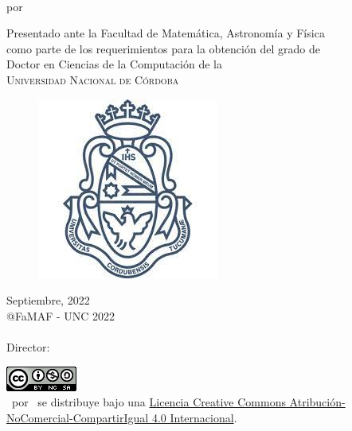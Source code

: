 \begin{titlepage}

\begin{center}
{\LARGE \ThesisTitle}\\ 
\vspace{10mm}
{\Large por \Author}\\

\vspace{35mm}

Presentado ante la Facultad de Matem\'atica, Astronom\'ia y F\'isica\\
como parte de los requerimientos para la obtenci\'on del grado de\\
Doctor en Ciencias de la Computaci\'on de la\\
\textsc{Universidad Nacional de C\'ordoba}\\
 
\vspace{20mm}

\begin{figure}[h] 
\begin{center}
    \includegraphics[scale=0.45]{Figs/cordoba.jpg} 
\end{center}
\end{figure}

Septiembre, 2022\\
@FaMAF - UNC 2022\\
\ \\
{\Large Director: \Supervisor}

\vspace{10mm}
\href{https://licensebuttons.net/l/by-nc-sa/4.0/88x31.png}{\includegraphics{Figs/licencia-famaf.png}}\\
\vspace{10mm}
{\ThesisTitle\ por \Author\ se distribuye bajo una \href{https://creativecommons.org/licenses/by-nc-sa/4.0/deed.es_ES}{Licencia Creative Commons Atribución-NoComercial-CompartirIgual 4.0 Internacional}.}
\end{center}  
\end{titlepage} 



